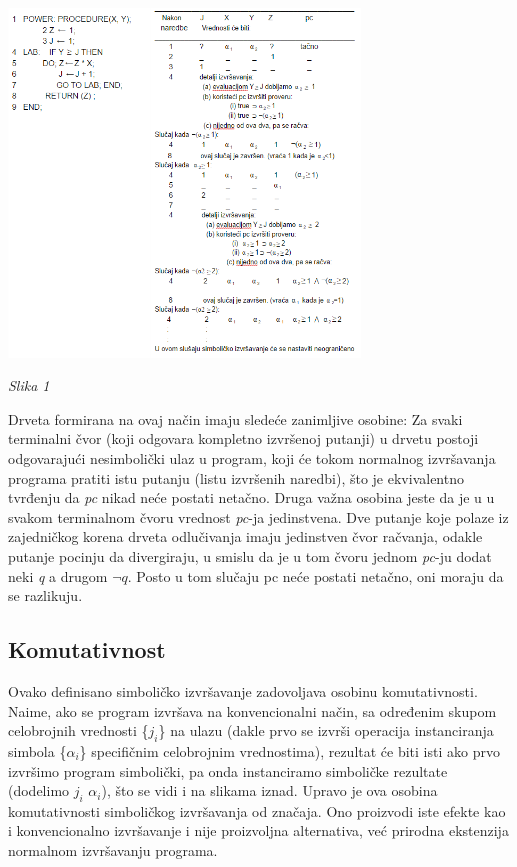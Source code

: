 \documentclass[a4paper]{article}
\begin{document}
{\includegraphics[width=0.7\textwidth]{novo}

\textit{Slika 1}

Drveta formirana na ovaj način imaju sledeće zanimljive osobine:
Za svaki terminalni čvor (koji odgovara kompletno izvršenoj putanji) u drvetu postoji odgovarajući nesimbolički ulaz u program, koji će tokom normalnog izvršavanja programa pratiti istu putanju (listu izvršenih naredbi), što je ekvivalentno tvrđenju  da \textit{pc} nikad neće postati netačno. Druga važna osobina jeste da je u u svakom terminalnom čvoru vrednost \textit{pc}-ja jedinstvena. Dve putanje koje polaze iz zajedničkog korena drveta odlučivanja imaju jedinstven čvor račvanja, odakle putanje pocinju da divergiraju, u smislu da je u tom čvoru jednom \textit{pc}-ju dodat neki \textit{q} a drugom $\neg q$. Posto u tom slučaju pc neće postati netačno, oni moraju da se razlikuju. 

\subsection{Komutativnost}

Ovako definisano simboličko izvršavanje zadovoljava osobinu komutativnosti. Naime, ako se program izvršava na konvencionalni način, sa određenim skupom celobrojnih vrednosti \{$j_i$\} na ulazu (dakle prvo se izvrši operacija instanciranja simbola \{$\alpha_i$\} specifičnim celobrojnim vrednostima), rezultat će biti isti ako prvo izvršimo program simbolički, pa onda instanciramo simboličke rezultate (dodelimo $j_i$ $\alpha_i$), što se vidi i na slikama iznad. Upravo je ova osobina komutativnosti simboličkog izvršavanja od značaja. Ono proizvodi iste efekte kao i konvencionalno izvršavanje i nije proizvoljna alternativa, već prirodna ekstenzija normalnom izvršavanju programa.

}
\end{document}
